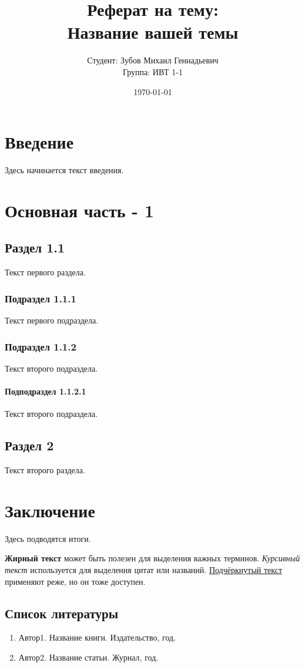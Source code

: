 \documentclass[14pt]{extreport}
\title{Реферат на тему: \\[0.5cm] \textbf{Название вашей темы}}
\author{Студент: Зубов Михаил Геннадьевич \\ Группа: ИВТ 1-1}
\date{\today}
\begin{document}
	
	\maketitle
	\tableofcontents
	
	\chapter{Введение}
	Здесь начинается текст введения.
	
	\chapter{Основная часть - 1}
	\section{Раздел 1.1}
	Текст первого раздела.
	
	\subsection{Подраздел 1.1.1}
	Текст первого подраздела.
	
	\subsection{Подраздел 1.1.2}
	Текст второго подраздела.
	
	\subsubsection{Подподраздел 1.1.2.1}
	Текст второго подраздела.
	
	\section{Раздел 2}
	Текст второго раздела.
	
	\chapter{Заключение}
	Здесь подводятся итоги.
	
	\textbf{Жирный текст} может быть полезен для выделения важных терминов. 
	\textit{Курсивный текст} используется для выделения цитат или названий. 
	\underline{Подчёркнутый текст} применяют реже, но он тоже доступен.
	
	\section{Список литературы}
	\begin{enumerate}
		\item Автор1. Название книги. Издательство, год.
		\item Автор2. Название статьи. Журнал, год.
	\end{enumerate}
	
\end{document}
